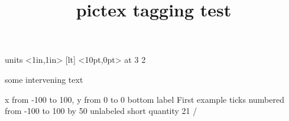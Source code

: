 \documentclass{article}
\title{pictex tagging test}
\begin{document}
\beginpicture
\setcoordinatesystem units <1in,1in>
 [lt] <10pt,0pt> at 3 2
\endpicture

some intervening text

\beginpicture
\setplotarea x from -100 to 100, y from 0 to 0
\axis bottom label {First example} ticks
numbered from -100 to 100 by 50
unlabeled short quantity 21 /
\endpicture
\end{document}

